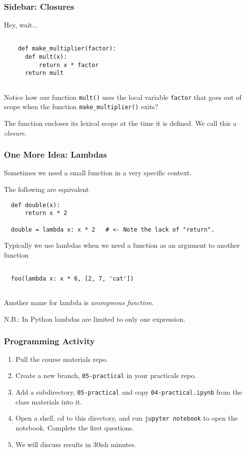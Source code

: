 \documentclass[10pt]{beamer}
\begin{document}
\begin{frame}[fragile]
  \frametitle{Sidebar: Closures}
  
  Hey, wait...
  \begin{verbatim}

    def make_multiplier(factor):
      def mult(x):
          return x * factor
      return mult
      
   \end{verbatim}
   Notice how our function \texttt{mult()} uses the local variable
   \texttt{factor} that goes out of scope when the function \texttt{make\_multiplier()}
   exits? 
   
   The function encloses its lexical scope at the time it is defined. We call this
   a \emph{closure}. 
   
\end{frame}

\begin{frame}[fragile]
  \frametitle{One More Idea: Lambdas}
  
  Sometimes we need a small function in a very specific context.
  
  The following are equivalent
  \begin{verbatim}
  def double(x):
      return x * 2
      
  double = lambda x: x * 2   # <- Note the lack of "return". 
  \end{verbatim}
  
  Typically we use lambdas when we need a function as an argument to another 
  function
  
  \begin{verbatim}
  
  foo(lambda x: x * 6, [2, 7, 'cat'])
  
  \end{verbatim}
  Another name for lambda is \emph{anonymous function}.
  
  N.B.: In Python lambdas are limited to only one expression.
  
\end{frame}
\begin{frame}
  \frametitle{Programming Activity}
  
  \begin{enumerate}
    \item Pull the course materials repo.
    \item Create a new branch, \texttt{05-practical} in your practicals repo.
    \item Add a subdirectory,  \texttt{05-practical} and copy \texttt{04-practical.ipynb} from the class materials into it.
    \item Open a shell, cd to this directory, and run \texttt{jupyter notebook} to open the notebook. Complete the first questions.
    \item We will discuss results in 30ish minutes.
  \end{enumerate}      
\end{frame}
\end{document}
